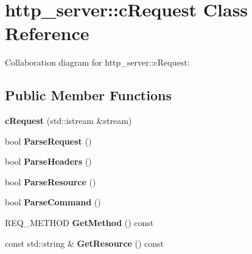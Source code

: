 \hypertarget{classhttp__server_1_1cRequest}{\section{http\-\_\-server\-:\-:c\-Request Class Reference}
\label{classhttp__server_1_1cRequest}
}


Collaboration diagram for http\-\_\-server\-:\-:c\-Request\-:
\subsection*{Public Member Functions}
\begin{DoxyCompactItemize}
\item 
\hypertarget{classhttp__server_1_1cRequest_aa3cadbdda5c1ad42a29f182bddc94fb1}{{\bfseries c\-Request} (std\-::istream \&stream)}\label{classhttp__server_1_1cRequest_aa3cadbdda5c1ad42a29f182bddc94fb1}

\item 
\hypertarget{classhttp__server_1_1cRequest_ac9531a813f05222ee24c7a27d2ec90fd}{bool {\bfseries Parse\-Request} ()}\label{classhttp__server_1_1cRequest_ac9531a813f05222ee24c7a27d2ec90fd}

\item 
\hypertarget{classhttp__server_1_1cRequest_a4042e926a9005f96117d0f24f6987ac0}{bool {\bfseries Parse\-Headers} ()}\label{classhttp__server_1_1cRequest_a4042e926a9005f96117d0f24f6987ac0}

\item 
\hypertarget{classhttp__server_1_1cRequest_ab623c396e4dbde0253c99c0a609f275f}{bool {\bfseries Parse\-Resource} ()}\label{classhttp__server_1_1cRequest_ab623c396e4dbde0253c99c0a609f275f}

\item 
\hypertarget{classhttp__server_1_1cRequest_a8acb2b752932b8fcb298902adca4987d}{bool {\bfseries Parse\-Command} ()}\label{classhttp__server_1_1cRequest_a8acb2b752932b8fcb298902adca4987d}

\item 
\hypertarget{classhttp__server_1_1cRequest_af0c3d838c88fef758115eda75cd66835}{R\-E\-Q\-\_\-\-M\-E\-T\-H\-O\-D {\bfseries Get\-Method} () const }\label{classhttp__server_1_1cRequest_af0c3d838c88fef758115eda75cd66835}

\item 
\hypertarget{classhttp__server_1_1cRequest_a808d2f736c751db6d111d2cbb2458470}{const std\-::string \& {\bfseries Get\-Resource} () const }\label{classhttp__server_1_1cRequest_a808d2f736c751db6d111d2cbb2458470}


\end{DoxyCompactItemize}
